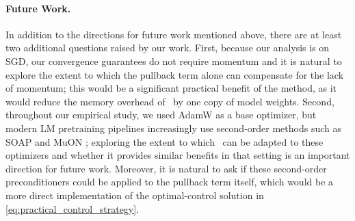 \paragraph{Future Work.} In addition to the directions for future work mentioned above, there are at least two additional questions raised by our work.  First, because our analysis is on SGD, our convergence guarantees do not require momentum and it is natural to explore the extent to which the pullback term alone can compensate for the lack of momentum; this would be a significant practical benefit of the method, as it would reduce the memory overhead of \pace\ by one copy of model weights.  Second, throughout our empirical study, we used AdamW as a base optimizer, but modern LM pretraining pipelines increasingly use second-order methods such as SOAP \citep{vyas2024soap} and MuON \citep{jordan2024muon}; exploring the extent to which \pace\ can be adapted to these optimizers and whether it provides similar benefits in that setting is an important direction for future work.  Moreover, it is natural to ask if these second-order preconditioners could be applied to the pullback term itself, which would be a more direct implementation of the optimal-control solution in \eqref{eq:practical_control_strategy}.





